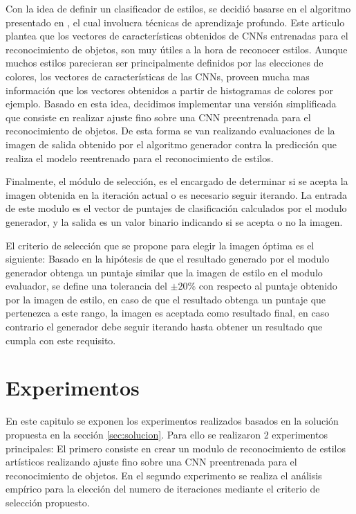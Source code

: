 \documentclass[a4paper,11pt,spanish]{book}
\begin{document}
      Con la idea de definir un clasificador de estilos, se decidió basarse en el algoritmo presentado en \cite{Karayev:Style_Recognition}, el cual involucra técnicas 
      de aprendizaje profundo.
      Este articulo plantea que los vectores de características obtenidos de CNNs entrenadas para el reconocimiento de objetos, son muy útiles 
      a la hora de reconocer estilos. 
      Aunque muchos estilos parecieran ser principalmente definidos por las elecciones de colores, los vectores de características de las CNNs, proveen mucha mas información
      que los vectores obtenidos a partir de histogramas de colores por ejemplo.
      Basado en esta idea, decidimos implementar una versión simplificada que consiste en realizar ajuste fino sobre una CNN preentrenada para el reconocimiento de objetos.
      De esta forma se van realizando evaluaciones de la imagen de salida obtenido por el algoritmo generador contra la predicción que realiza el modelo reentrenado para el reconocimiento de estilos.

      Finalmente, el módulo de selección, es el encargado de determinar si se acepta la imagen obtenida en la iteración actual o es necesario seguir iterando. 
      La entrada de este modulo es el vector de puntajes de clasificación calculados por el modulo generador, y la salida es un valor binario indicando si se acepta o no la imagen.
      
      El criterio de selección que se propone para elegir la imagen óptima es el siguiente:
      Basado en la hipótesis de que el resultado generado por el modulo generador obtenga un puntaje similar que la imagen de estilo en el modulo evaluador, 
      se define una tolerancia del $\pm 20\%$ con respecto al puntaje obtenido por la imagen de estilo, en caso de que el resultado obtenga un puntaje que pertenezca
      a este rango, la imagen es aceptada como resultado final, en caso contrario el generador debe seguir iterando hasta obtener un resultado que cumpla con este requisito.


\chapter{Experimentos} \label{chap:experimentos}
 En este capitulo se exponen los experimentos realizados basados en la solución propuesta en la sección \ref{sec:solucion}.
 Para ello se realizaron 2 experimentos principales: El primero consiste en crear un modulo de reconocimiento de estilos artísticos realizando ajuste fino sobre una CNN preentrenada
 para el reconocimiento de objetos. En el segundo experimento se realiza el análisis empírico para la elección del numero de iteraciones mediante el criterio de selección propuesto.
\end{document}
